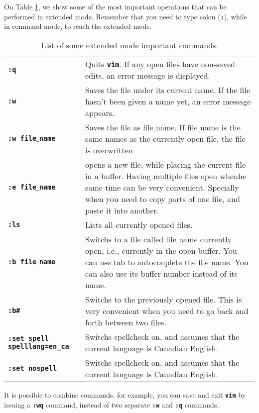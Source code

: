 On Table \ref{tab:ch5_ex_commands}, we show some of the most important operations that can be performed in extended mode. Remember that you need to type colon (\textbf{\texttt{:}}), while in command mode, to reach the extended mode.

\begin{table}[!htb]
   \myfloatalign
   \begin{tabularx}{\textwidth}{Xp{81mm}} \toprule
      \textbf{\texttt{:q}} & Quits \textbf{\texttt{vim}}. If any open files have non-saved edits, an error message is displayed. \\     \textbf{\texttt{:w}}  & Saves the file under its current name. If the file hasn't been given a name yet, an error message appears. \\
     \textbf{\texttt{:w file$\_$name}} & Saves the file as file$\_$name. If file$\_$name is the same names as the currently open file, the file is overwritten \\
      \textbf{\texttt{:e file$\_$name}} & opens a new file, while placing the current file in a buffer. Having multiple files open whenhe same time can be very convenient. Specially when you need to copy parts of one file, and paste it into another. \\
      \textbf{\texttt{:ls}} & Lists all currently opened files.\\
      \textbf{\texttt{:b file$\_$name}} & Switchs to a file called file$\_$name currently open, i.e., currently in the open buffer. You can use tab to autoconplete the file name. You can also use its buffer number instead of its name.\\
      \textbf{\texttt{:b\#}} & Switchs to the previously opened file. This is very convenient when you need to go back and forth between two files.\\
      \textbf{\texttt{:set spell spelllang=en\_ca}} & Switchs spellcheck on, and assumes that the current language is Canadian English.\\
      \textbf{\texttt{:set nospell}} & Switchs spellcheck on, and assumes that the current language is Canadian English.\\
   \bottomrule
   \end{tabularx}
\caption{List of some extended mode important commands.}
\label{tab:ch5_ex_commands}
\end{table}

It is possible to combine commands. for example, you can save and exit \textbf{\texttt{vim}} by issuing a \textbf{\texttt{:wq}} command, instead of two separate \textbf{\texttt{:w}} and \textbf{\texttt{:q}} commands..

